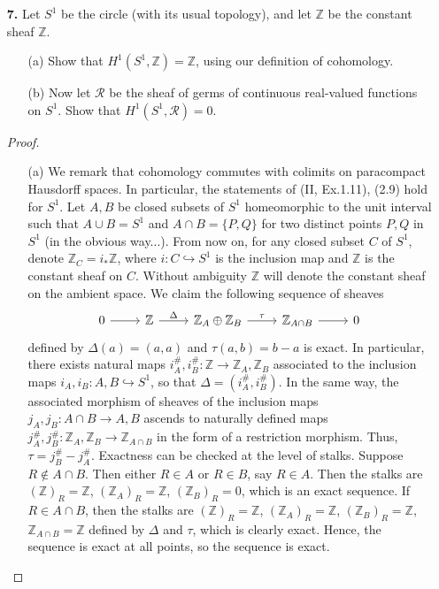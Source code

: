 \documentclass{article}
\newcommand{\fR}{\mathscr{R}}
\newcommand{\Z}{\mathbb{Z}}
\begin{document}
\begin{enumerate} [label=\textbf{\arabic*.}, leftmargin=0em]
\begin{proof} 
\end{proof}

\item[\textbf{7.}] Let $S^1$ be the circle (with its usual topology), and let $\Z$ be the constant sheaf $\Z$.
\begin{itemize}
    \item[(a)] Show that $H^1(S^1, \Z) = \Z$, using our definition of cohomology.
    \item[(b)] Now let $\fR$ be the sheaf of germs of continuous real-valued functions on $S^1$. Show that $H^1(S^1, \fR) = 0$.
\end{itemize}

\begin{proof} $ $ \vspace{0pt}
\begin{itemize} [leftmargin=0cm]
\item[(a)] We remark that cohomology commutes with colimits on paracompact Hausdorff spaces. In particular, the statements of (II, Ex.1.11), (2.9) hold for $S^1$. Let $A, B$ be closed subsets of $S^1$ homeomorphic to the unit interval such that $A \cup B = S^1$ and $A \cap B = \{ P, Q \}$ for two distinct points $P, Q$ in $S^1$ (in the obvious way...). From now on, for any closed subset $C$ of $S^1$, denote $\Z_C = i_* \Z$, where $i : C \hookrightarrow S^1$ is the inclusion map and $\Z$ is the constant sheaf on $C$. Without ambiguity $\Z$ will denote the constant sheaf on the ambient space. We claim the following sequence of sheaves
\[\begin{tikzcd}
    0 \arrow[r] & \Z \arrow[r, "\Delta"] & \Z_A \oplus \Z_B \arrow[r, "\tau"] & \Z_{A \cap B} \arrow[r] & 0
    \end{tikzcd}\]
defined by $\Delta(a) = (a, a)$ and $\tau(a, b) = b - a$ is exact. In particular, there exists natural maps $i^\#_A, i^\#_B : \Z \to \Z_A, \Z_B$ associated to the inclusion maps $i_A, i_B : A, B \hookrightarrow S^1$, so that $\Delta = (i_A^\#, i_B^\#)$. In the same way, the associated morphism of sheaves of the inclusion maps $j_A, j_B : A \cap B \to A, B$ ascends to naturally defined maps $j_A^\#, j_B^\# : \Z_A, \Z_B \to \Z_{A \cap B}$ in the form of a restriction morphism. Thus, $\tau = j_B^\# - j_A^\#$. Exactness can be checked at the level of stalks. Suppose $R \notin A \cap B$. Then either $R \in A$ or $R \in B$, say $R \in A$. Then the stalks are $(\Z)_R = \Z$, $(\Z_A)_R = \Z$, $(\Z_B)_R = 0$, which is an exact sequence. If $R \in A \cap B$, then the stalks are $(\Z)_R = \Z$, $(\Z_A)_R = \Z$, $(\Z_B)_R = \Z$, $\Z_{A \cap B} = \Z$ defined by $\Delta$ and $\tau$, which is clearly exact. Hence, the sequence is exact at all points, so the sequence is exact.


\end{itemize}
\end{proof}
\end{enumerate}
\end{document}
